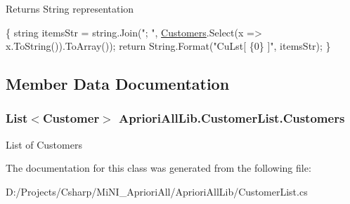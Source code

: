 \begin{DoxyReturn}{Returns}
String representation
\end{DoxyReturn}

\begin{DoxyCode}
                                          \{
            \textcolor{keywordtype}{string} itemsStr = \textcolor{keywordtype}{string}.Join(\textcolor{stringliteral}{"; "}, \hyperlink{class_apriori_all_lib_1_1_customer_list_a4fd2a16a984844e61ffc60b327e6534a}{Customers}.Select(x => 
      x.ToString()).ToArray());
            \textcolor{keywordflow}{return} String.Format(\textcolor{stringliteral}{"CuLst[ \{0\} ]"}, itemsStr);
        \}
\end{DoxyCode}


\subsection{Member Data Documentation}
\hypertarget{class_apriori_all_lib_1_1_customer_list_a4fd2a16a984844e61ffc60b327e6534a}{
\subsubsection[{Customers}]{\setlength{\rightskip}{0pt plus 5cm}List$<${\bf Customer}$>$ Apriori\-All\-Lib.\-Customer\-List.\-Customers}}\label{class_apriori_all_lib_1_1_customer_list_a4fd2a16a984844e61ffc60b327e6534a}


List of Customers 



The documentation for this class was generated from the following file\-:\begin{DoxyCompactItemize}
\item 
D\-:/\-Projects/\-Csharp/\-Mi\-N\-I\-\_\-\-Apriori\-All/\-Apriori\-All\-Lib/Customer\-List.\-cs\end{DoxyCompactItemize}
